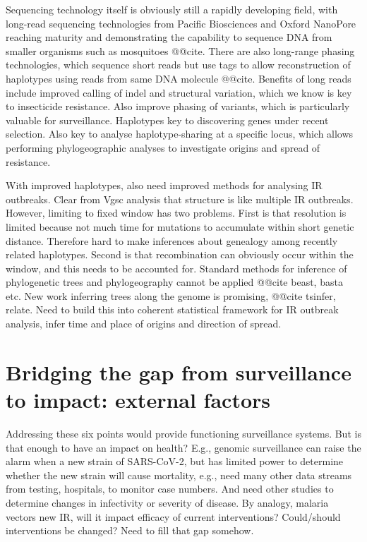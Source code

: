 \documentclass[a4paper,11pt,abstracton,hidelinks]{scrartcl}
\begin{document}
Sequencing technology itself is obviously still a rapidly developing field, with long-read sequencing technologies from Pacific Biosciences and Oxford NanoPore reaching maturity and demonstrating the capability to sequence DNA from smaller organisms such as mosquitoes @@cite.
%
There are also long-range phasing technologies, which sequence short reads but use tags to allow reconstruction of haplotypes using reads from same DNA molecule @@cite.
%
Benefits of long reads include improved calling of indel and structural variation, which we know is key to insecticide resistance.
%
Also improve phasing of variants, which is particularly valuable for surveillance.
%
Haplotypes key to discovering genes under recent selection.
%
Also key to analyse haplotype-sharing at a specific locus, which allows performing phylogeographic analyses to investigate origins and spread of resistance.


With improved haplotypes, also need improved methods for analysing IR outbreaks.
%
Clear from Vgsc analysis that structure is like multiple IR outbreaks.
%
However, limiting to fixed window has two problems.
%
First is that resolution is limited because not much time for mutations to accumulate within short genetic distance.
%
Therefore hard to make inferences about genealogy among recently related haplotypes.
%
Second is that recombination can obviously occur within the window, and this needs to be accounted for.
%
Standard methods for inference of phylogenetic trees and phylogeography cannot be applied @@cite beast, basta etc.
%
New work inferring trees along the genome is promising, @@cite tsinfer, relate.
%
Need to build this into coherent statistical framework for IR outbreak analysis, infer time and place of origins and direction of spread.


\section{Bridging the gap from surveillance to impact: external factors}\label{sec:external}


Addressing these six points would provide functioning surveillance systems.
%
But is that enough to have an impact on health?
%
E.g., genomic surveillance can raise the alarm when a new strain of SARS-CoV-2, but has limited power to determine whether the new strain will cause mortality, e.g., need many other data streams from testing, hospitals, to monitor case numbers.
And need other studies to determine changes in infectivity or severity of disease.
%
By analogy, malaria vectors new IR, will it impact efficacy of current interventions?
Could/should interventions be changed?
Need to fill that gap somehow.
\end{document}
